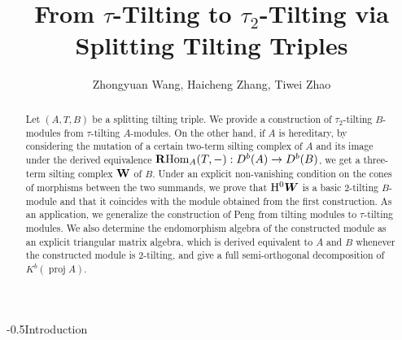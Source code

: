\documentclass[reqno,12pt]{amsart}
\makeatletter
\numberwithin{equation}{section}
\theoremstyle{plain}
\theoremstyle{definition}
\renewcommand{\section}{\@startsection{section}{1}{0mm}
  {-\baselineskip}{0.5\baselineskip}{\bf\leftline}}
\makeatother
\begin{document}
\title[From \(\tau\)-Tilting to \(\tau_2\)-Tilting via Splitting Tilting Triples]{From \(\tau\)-Tilting to \(\tau_2\)-Tilting via Splitting Tilting Triples}
\author{Zhongyuan Wang, Haicheng Zhang, Tiwei Zhao}
\address[Z. Wang, H. Zhang]{Ministry of Education Key Laboratory of NSLSCS, School of Mathematical Sciences, Nanjing Normal University, Nanjing 210023, P. R. China}



\address[T. Zhao]{School of Artificial Intelligence, Jianghan University,
Wuhan 430056, P. R. China}


\begin{abstract}
Let $(A,T,B)$ be a splitting tilting triple. We provide a construction of $\tau_2$-tilting $B$-modules from $\tau$-tilting $A$-modules.
On the other hand, if $A$ is hereditary, by considering the mutation of a certain two-term silting complex of $A$
and its image under the derived equivalence $\mathbf{R}\mbox{\rm Hom}_A(T,-):D^b(A)\to D^b(B)$, we get a three-term silting complex ${\bf W}$ of $B$.
Under an explicit non-vanishing condition on the cones of morphisms between the two summands, we prove that ${\rm H}^0\boldsymbol{W}$ is a basic $2$-tilting $B$-module and that it coincides with the module obtained from the first construction.
As an application, we generalize the construction of Peng \cite{PENG} from tilting modules to $\tau$-tilting modules.
We also determine the endomorphism algebra of the constructed module as an
explicit triangular matrix algebra, which is derived equivalent to $A$ and $B$ whenever the constructed module is
$2$-tilting, and  give
a full semi-orthogonal decomposition of $K^b(\operatorname{proj}A)$.
\end{abstract}



\maketitle

\section{Introduction}
\end{document}
